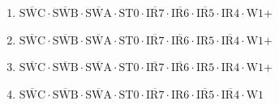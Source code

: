 \documentclass[UTF8]{ctexart}
\begin{document}
\begin{enumerate}[\indent\indent]
	\item$\overline{\text{SWC}}\cdot\overline{\text{SWB}}\cdot\overline{\text{SWA}}\cdot\text{ST0}\cdot\overline{\text{IR7}}\cdot\overline{\text{IR6}}\cdot\overline{\text{IR5}}\cdot\text{IR4}\cdot\text{W1}$+
	\item$\overline{\text{SWC}}\cdot\overline{\text{SWB}}\cdot\overline{\text{SWA}}\cdot\text{ST0}\cdot\overline{\text{IR7}}\cdot\overline{\text{IR6}}\cdot{\text{IR5}}\cdot\overline{\text{IR4}}\cdot\text{W1}$+
	\item$\overline{\text{SWC}}\cdot\overline{\text{SWB}}\cdot\overline{\text{SWA}}\cdot\text{ST0}\cdot\overline{\text{IR7}}\cdot\overline{\text{IR6}}\cdot\text{IR5}\cdot\text{IR4}\cdot\text{W1}$+
	\item$\overline{\text{SWC}}\cdot\overline{\text{SWB}}\cdot\overline{\text{SWA}}\cdot\text{ST0}\cdot\overline{\text{IR7}}\cdot{\text{IR6}}\cdot\overline{\text{IR5}}\cdot\overline{\text{IR4}}\cdot\text{W1}$
\end{enumerate}
\end{document}
